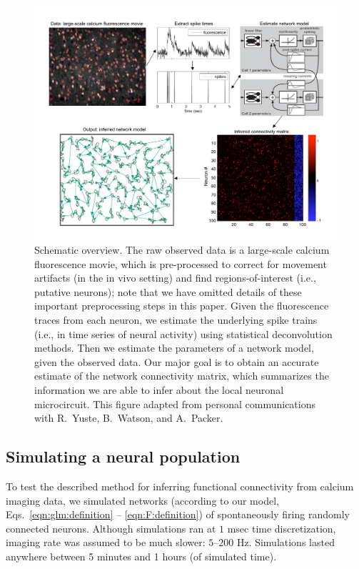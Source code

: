 \begin{figure}[t!] 
	\centering 
	\includegraphics[width=\hsize]{../figs/yuri-paper-schematic} 
	\caption{Schematic overview. The raw observed data is a large-scale calcium fluorescence movie, which is pre-processed to correct for movement artifacts (in the in vivo setting) and find regions-of-interest (i.e., putative neurons); note that we have omitted details of these important preprocessing steps in this paper. Given the fluorescence traces from each neuron, we estimate the underlying spike trains (i.e., in time series of neural activity) using statistical deconvolution methods. Then we estimate the parameters of a network model, given the observed data. Our major goal is to obtain an accurate estimate of the network connectivity matrix, which summarizes the information we are able to infer about the local neuronal microcircuit. This figure adapted from personal communications with R.\ Yuste, B.\ Watson, and A.\ Packer.} 
	\label{fig:data_schematic} 
\end{figure}

\subsection{Simulating a neural population} \label{sec:results:simulations}

To test the described method for inferring functional connectivity from calcium imaging data, we simulated networks (according to our model, Eqs.~\eqref{eqn:glm:definition} -- \eqref{eqn:F:definition}) of spontaneously firing randomly connected neurons. Although simulations ran at $1$ msec time discretization, imaging rate was assumed to be much slower: $5$--$200$ Hz. Simulations lasted anywhere between 5 minutes and 1 hours (of simulated time). 

